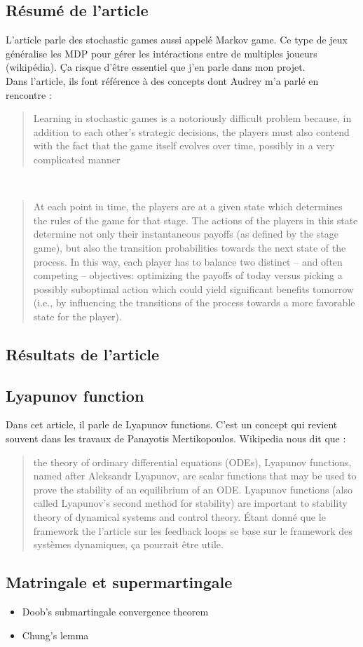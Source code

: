 \documentclass{article}
\begin{document}
\subsection{Résumé de l'article}
L'article parle des stochastic games aussi appelé Markov game. Ce type de jeux généralise les MDP pour gérer les intéractions entre de multiples joueurs (wikipédia). Ça risque d'être essentiel que j'en parle dans mon projet. 
\\ 
Dans l'article, ils font référence à des concepts dont Audrey m'a parlé en rencontre : 
\\
\begin{quote}
    Learning in stochastic games is a notoriously difficult problem because, in addition to each other’s strategic decisions, the players must also contend with the fact that the game itself evolves over time, possibly in a very complicated manner
\end{quote}
\\
\begin{quote}
    At each point in time, the players are at a given state which determines the rules of the game for that stage. The actions of the players in this state determine not only their instantaneous payoffs (as defined by the stage game), but also the transition probabilities towards the next state of the process. In this way, each player has to balance two distinct – and often competing – objectives: optimizing the payoffs of today versus picking a possibly suboptimal action which could yield significant benefits tomorrow (i.e., by influencing the transitions of the process towards a more favorable state for the player).
\end{quote}

\subsection{Résultats de l'article}

\subsection{Lyapunov function}
Dans cet article, il parle de  Lyapunov functions. C'est un concept qui revient souvent dans les travaux de Panayotis Mertikopoulos. Wikipedia nous dit que : 
\begin{quote}    
the theory of ordinary differential equations (ODEs), Lyapunov functions, named after Aleksandr Lyapunov, are scalar functions that may be used to prove the stability of an equilibrium of an ODE. Lyapunov functions (also called Lyapunov’s second method for stability) are important to stability theory of dynamical systems and control theory. Étant donné que le framework the l'article sur les feedback loops \cite{mansoury_feedback_2020} se base sur le framework des systèmes dynamiques, ça pourrait être utile.
\end{quote}

\subsection{Matringale et supermartingale}
\begin{itemize}
    \item Doob’s submartingale convergence theorem
    \item Chung’s lemma
\end{itemize}




\end{document}
